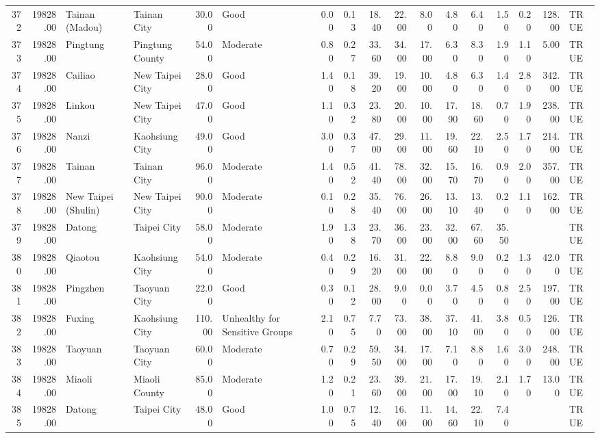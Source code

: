 \begin{table}[ht]
\begin{tabular}{rrllrlrrrrrrrrrrl}
  372 & 19828.00 & Tainan (Madou) & Tainan City & 30.00 & Good & 0.00 & 0.13 & 18.40 & 22.00 & 8.00 & 4.80 & 6.40 & 1.50 & 0.20 & 128.00 & TRUE \\ 
  373 & 19828.00 & Pingtung & Pingtung County & 54.00 & Moderate & 0.80 & 0.27 & 33.60 & 34.00 & 17.00 & 6.30 & 8.30 & 1.90 & 1.10 & 5.00 & TRUE \\ 
  374 & 19828.00 & Cailiao & New Taipei City & 28.00 & Good & 1.40 & 0.18 & 39.20 & 19.00 & 10.00 & 4.80 & 6.30 & 1.40 & 2.80 & 342.00 & TRUE \\ 
  375 & 19828.00 & Linkou & New Taipei City & 47.00 & Good & 1.10 & 0.32 & 23.80 & 20.00 & 10.00 & 17.90 & 18.60 & 0.70 & 1.90 & 238.00 & TRUE \\ 
  376 & 19828.00 & Nanzi & Kaohsiung City & 49.00 & Good & 3.00 & 0.37 & 47.00 & 29.00 & 11.00 & 19.60 & 22.10 & 2.50 & 1.70 & 214.00 & TRUE \\ 
  377 & 19828.00 & Tainan & Tainan City & 96.00 & Moderate & 1.40 & 0.52 & 41.40 & 78.00 & 32.00 & 15.70 & 16.70 & 0.90 & 2.00 & 357.00 & TRUE \\ 
  378 & 19828.00 & New Taipei (Shulin) & New Taipei City & 90.00 & Moderate & 0.10 & 0.28 & 35.40 & 76.00 & 26.00 & 13.10 & 13.40 & 0.20 & 1.10 & 162.00 & TRUE \\ 
  379 & 19828.00 & Datong & Taipei City & 58.00 & Moderate & 1.90 & 1.38 & 23.70 & 36.00 & 23.00 & 32.00 & 67.60 & 35.50 &  &  & TRUE \\ 
  380 & 19828.00 & Qiaotou & Kaohsiung City & 54.00 & Moderate & 0.40 & 0.29 & 16.20 & 31.00 & 22.00 & 8.80 & 9.00 & 0.20 & 1.30 & 42.00 & TRUE \\ 
  381 & 19828.00 & Pingzhen & Taoyuan City & 22.00 & Good & 0.30 & 0.12 & 28.00 & 9.00 & 0.00 & 3.70 & 4.50 & 0.80 & 2.50 & 197.00 & TRUE \\ 
  382 & 19828.00 & Fuxing & Kaohsiung City & 110.00 & Unhealthy for Sensitive Groups & 2.10 & 0.75 & 7.70 & 73.00 & 38.00 & 37.10 & 41.00 & 3.80 & 0.50 & 126.00 & TRUE \\ 
  383 & 19828.00 & Taoyuan & Taoyuan City & 60.00 & Moderate & 0.70 & 0.29 & 59.50 & 34.00 & 17.00 & 7.10 & 8.80 & 1.60 & 3.00 & 248.00 & TRUE \\ 
  384 & 19828.00 & Miaoli & Miaoli County & 85.00 & Moderate & 1.20 & 0.21 & 23.60 & 39.00 & 21.00 & 17.00 & 19.10 & 2.10 & 1.70 & 13.00 & TRUE \\ 
  385 & 19828.00 & Datong & Taipei City & 48.00 & Good & 1.00 & 0.75 & 12.40 & 16.00 & 11.00 & 14.60 & 22.10 & 7.40 &  &  & TRUE \\ 

\end{tabular}
\end{table}
